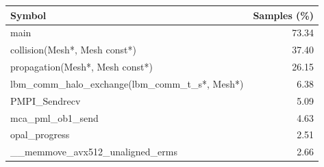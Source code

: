 \begin{tabular}{@{}lr@{}}
\toprule
Symbol & Samples (\%) \\
\midrule
main & 73.34 \\
collision(Mesh*, Mesh const*) & 37.40 \\
propagation(Mesh*, Mesh const*) & 26.15 \\
lbm\_comm\_halo\_exchange(lbm\_comm\_t\_s*, Mesh*) & 6.38 \\
PMPI\_Sendrecv & 5.09 \\
mca\_pml\_ob1\_send & 4.63 \\
opal\_progress & 2.51 \\
\_\_memmove\_avx512\_unaligned\_erms & 2.66 \\
\bottomrule
\end{tabular}
